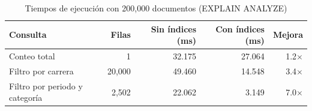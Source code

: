 \begin{table}[H]
\centering
\caption{Tiempos de ejecución con 200{,}000 documentos (EXPLAIN ANALYZE)}
\begin{tabular}{|l|r|r|r|r|}
\hline
\textbf{Consulta} & \textbf{Filas} & \textbf{Sin índices (ms)} & \textbf{Con índices (ms)} & \textbf{Mejora} \\ \hline
Conteo total & 1 & 32.175 & 27.064 & 1.2$\times$ \\ \hline
Filtro por carrera & 20{,}000 & 49.460 & 14.548 & 3.4$\times$ \\ \hline
Filtro por periodo y categoría & 2{,}502 & 22.062 & 3.149 & 7.0$\times$ \\ \hline
\end{tabular}
\end{table}
